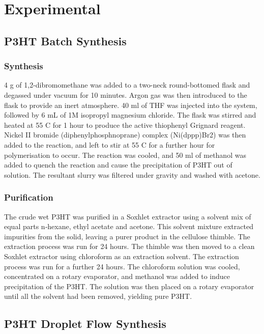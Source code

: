 \chapter{Experimental}

\section{P3HT Batch Synthesis}

\subsection{Synthesis}

4 g of 1,2-dibromomethane was added to a two-neck round-bottomed flask and degassed under vacuum for 10 minutes. Argon gas was then introduced to the flask to provide an inert atmosphere. 40 ml of THF was injected into the system, followed by 6 mL of 1M isopropyl magnesium chloride. The flask was stirred and heated at 55 C for 1 hour to produce the active thiophenyl Grignard reagent. Nickel II bromide (diphenylphosphnoprane) complex (Ni(dppp)Br2) was then added to the reaction, and left to stir at 55 C for a further hour for polymerisation to occur. The reaction was cooled, and 50 ml of methanol was added to quench the reaction and cause the precipitation of P3HT out of solution. The resultant slurry was filtered under gravity and washed with acetone.

\subsection{Purification}

The crude wet P3HT was purified in a Soxhlet extractor using a solvent mix of equal parts n‑hexane, ethyl acetate and acetone. This solvent mixture extracted impurities from the solid, leaving a purer product in the cellulose thimble. The extraction process was run for 24 hours. The thimble was then moved to a clean Soxhlet extractor using chloroform as an extraction solvent. The extraction process was run for a further 24 hours. The chloroform solution was cooled, concentrated on a rotary evaporator, and methanol was added to induce precipitation of the P3HT. The solution was then placed on a rotary evaporator until all the solvent had been removed, yielding pure P3HT.


\section{P3HT Droplet Flow Synthesis}

